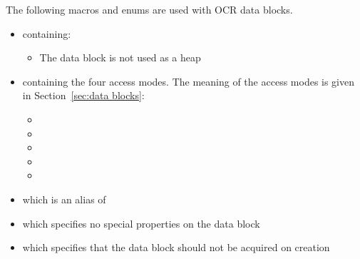 The following macros and enums are used with OCR data blocks.
\begin{itemize}
\item \hypertarget{type_ocrInDbAllocator_t}{} containing:
  \begin{itemize}
  \item {} The data block is not used as a heap
  \end{itemize}
\item \hypertarget{type_ocrDbAccessMode_t}{}
  containing the four access modes. The
  meaning of the access modes is given in Section~\ref{sec:data blocks}:
  \begin{itemize}
    \item {}
    \item {}
    \item {}
    \item {}
    \item {}
  \end{itemize}
\item {} which is an alias of 
\item {} which specifies no special properties on the data block
\item {} which specifies that the data block should
  not be acquired on creation
\end{itemize}


